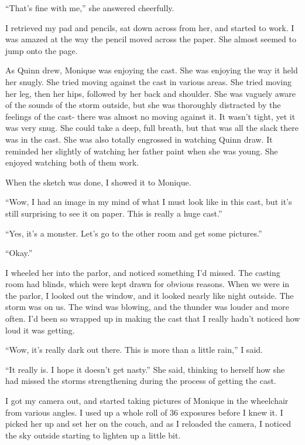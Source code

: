 ``That's fine with me,'' she answered cheerfully.

I retrieved my pad and pencils, sat down across from her, and started to work. I was
amazed at the way the pencil moved across the paper. She almost seemed to jump onto the page.

\begin{thought}
As Quinn drew, Monique was enjoying the cast. She was enjoying the way it held her snugly.
She tried moving against the cast in various areas. She tried moving her leg, then her hips,
followed by her back and shoulder. She was vaguely aware of the sounds of the storm outside, but
she was thoroughly distracted by the feelings of the cast- there was almost no moving against
it. It wasn't tight, yet it was very snug. She could take a deep, full breath, but that was all
the slack there was in the cast. She was also totally engrossed in watching Quinn draw. It
reminded her slightly of watching her father paint when she was young. She enjoyed watching both
of them work.
\end{thought}

When the sketch was done, I showed it to Monique.

``Wow, I had an image in my mind of what I must look like in this cast, but it's still
surprising to see it on paper. This is really a huge cast.''

``Yes, it's a monster. Let's go to the other room and get some pictures.''

``Okay.''

I wheeled her into the parlor, and noticed something I'd missed. The casting room had
blinds, which were kept drawn for obvious reasons. When we were in the parlor, I looked out the
window, and it looked nearly like night outside. The storm was on us. The wind was blowing, and
the thunder was louder and more often. I'd been so wrapped up in making the cast that I really
hadn't noticed how loud it was getting.

``Wow, it's really dark out there. This is more than a little rain,'' I said.

``It really is. I hope it doesn't get nasty.'' She said, thinking to herself how she had
missed the storms strengthening during the process of getting the cast.

I got my camera out, and started taking pictures of Monique in the wheelchair from various
angles. I used up a whole roll of 36 exposures before I knew it. I picked her up and set her on
the couch, and as I reloaded the camera, I noticed the sky outside starting to lighten up a
little bit.

